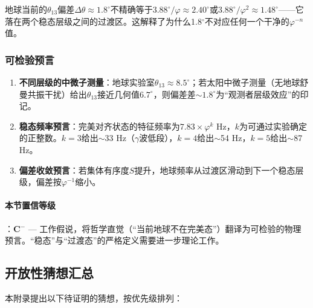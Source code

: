 \documentclass[12pt,a4paper,twocolumn]{article}
\renewcommand{\phi}{\varphi}
\begin{document}
地球当前的$\theta_{13}$偏差$\Delta\theta \approx 1.8^\circ$不精确等于$3.88^\circ/\phi \approx 2.40^\circ$或$3.88^\circ/\phi^2 \approx 1.48^\circ$——它落在两个稳态层级之间的过渡区。这解释了为什么1.8$^\circ$不对应任何一个干净的$\phi^{-n}$值。

\subsubsection{可检验预言}

\begin{enumerate}
\item \textbf{不同层级的中微子测量}：地球实验室$\theta_{13}\approx 8.5^\circ$；若太阳中微子测量（无地球舒曼共振干扰）给出$\theta_{13}$接近几何值$6.7^\circ$，则偏差差$\sim 1.8^\circ$为``观测者层级效应''的印记。
\item \textbf{稳态频率预言}：完美对齐状态的特征频率为$7.83\times\phi^k$ Hz，$k$为可通过实验确定的正整数。$k=3$给出$\sim$33 Hz（$\gamma$波低段），$k=4$给出$\sim$54 Hz，$k=5$给出$\sim$87 Hz。
\item \textbf{偏差收敛预言}：若集体有序度$S$提升，地球频率从过渡区滑动到下一个稳态层级，偏差按$\phi^{-1}$缩小。
\end{enumerate}

\paragraph{本节置信等级}：\textbf{C$^-$} --- 工作假说，将哲学直觉（``当前地球不在完美态''）翻译为可检验的物理预言。``稳态''与``过渡态''的严格定义需要进一步理论工作。

\subsection{开放性猜想汇总}
\label{subsec:conjectures}

本附录提出以下待证明的猜想，按优先级排列：
\end{document}
